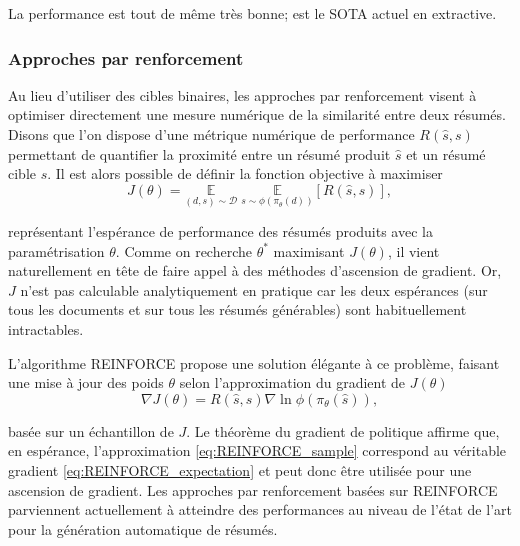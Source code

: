La performance est tout de même très bonne; \citep{zhong-etal-2020-extractive} est le SOTA
actuel en extractive.

\subsubsection*{Approches par renforcement}
\label{subsec:rl_summ}

Au lieu d'utiliser des cibles binaires, les approches par renforcement visent à
optimiser directement une mesure numérique de la similarité entre deux résumés.
Disons que l'on dispose d'une métrique numérique de performance $R(\hat{s}, s)$
permettant de quantifier la proximité entre un résumé produit $\hat{s}$ et un résumé
cible $s$.
Il est alors possible de définir la fonction objective à maximiser
\begin{equation}
    J(\theta) = \underset{(d,s) \sim \mathcal{D}}{\mathbb{E}} \; \underset{s \sim \phi(\pi_\theta(d))}{\mathbb{E}} \left[R(\hat{s}, s) \right],
    \label{eq:REINFORCE_expectation}
\end{equation}

représentant l'espérance de performance des résumés produits avec la paramétrisation $\theta$.
Comme on recherche $\theta^*$ maximisant $J(\theta)$, il vient naturellement en tête
de faire appel à des méthodes d'ascension de gradient.
Or, $J$ n'est pas calculable analytiquement en pratique car les deux espérances (sur
tous les documents et sur tous les résumés générables) sont habituellement intractables.


L'algorithme REINFORCE \citep{williams1992simple} propose une
solution élégante à ce problème, faisant une mise à jour des poids $\theta$ selon l'approximation du gradient
de $J(\theta)$
\begin{equation}
    \nabla J(\theta) = R(\hat{s}, s)\nabla \ln \phi\left(\pi_\theta (\hat{s})\right),
    \label{eq:REINFORCE_sample}
\end{equation}

basée sur un échantillon de $J$.
Le théorème du gradient de politique \citep{sutton1999policy} affirme que, en espérance,
l'approximation \ref{eq:REINFORCE_sample} correspond au véritable gradient \ref{eq:REINFORCE_expectation}
et peut donc être utilisée pour une ascension de gradient.
Les approches par renforcement basées sur REINFORCE \citep{dong2018banditsum,luo-etal-2019-reading}
parviennent actuellement à atteindre des performances au niveau de l'état
de l'art pour la génération automatique de résumés.

